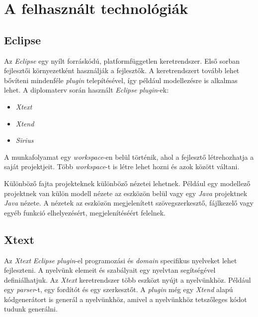 \clearpage\section{A felhasznált technológiák}
\subsection{Eclipse}

Az \textit{Eclipse} \cite{Eclipse} egy nyílt forráskódú, platformfüggetlen keretrendszer.
Első sorban fejlesztői környezetként használják a fejlesztők.
A keretrendszert tovább lehet bővíteni mindenféle \textit{plugin} telepítésével, így például modellezésre is alkalmas lehet.
A diplomaterv során használt \textit{Eclipse} \textit{plugin}-ek:

\begin{itemize}
    \item \textit{Xtext}
    \item \textit{Xtend}
    \item \textit{Sirius}
\end{itemize}

A munkafolyamat egy \textit{workspace}-en belül történik, ahol a fejlesztő létrehozhatja a saját projektjeit.
Több \textit{workspace}-t is létre lehet hozni és azok között váltani.

Különböző fajta projekteknek különböző nézetei lehetnek.
Például egy modellező projektnek van külön modell nézete az eszközön belül vagy egy \textit{Java} projektnek \textit{Java} nézete.
A nézetek az eszközön megjelenített szövegszerkesztő, fájlkezelő vagy egyéb funkció elhelyezésért, megjelenítéséért felelnek.

\subsection{Xtext}

Az \textit{Xtext} \cite{Xtext} \textit{Eclipse} \textit{plugin}-el programozási és \textit{domain} specifikus nyelveket lehet fejleszteni.
A nyelvünk elemeit és szabályait egy nyelvtan segítségével definiálhatjuk.
Az \textit{Xtext} keretrendszer több eszközt nyújt a nyelvünkhöz.
Például egy \textit{parser}-t, egy fordítót és egy szerkesztőt.
A \textit{plugin} még egy \textit{Xtend} alapú kódgenerátort is generál a nyelvünkhöz, amivel a nyelvünkhöz tetszőleges kódot tudunk generálni.

